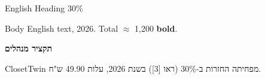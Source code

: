 \documentclass[a4paper,11pt]{article}
\begin{document}
{\headfont\Large English Heading 30\%}\par
Body English text, 2026. Total $\approx$ 1,200 \textbf{bold}.\par
\begin{otherlanguage}{hebrew}
\textbf{תקציר מנהלים}\par
ClosetTwin מפחיתה החזרות ב-30\% (ראו [3]) בשנת 2026, עלות 49.90 ש"ח.
\end{otherlanguage}
\end{document}

